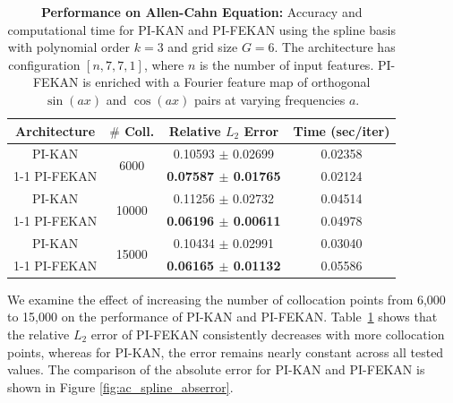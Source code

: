 \documentclass{article}
\begin{document}
\begin{table}[h!]
\centering
\begin{tabular}{|c|c||c|c||}
\hline
\textbf{Architecture} & \textbf{$\#$ Coll.} & \textbf{Relative $L_2$ Error} & \textbf{Time (sec/iter)} \\
\hline\hline
PI-KAN & \multirow{2}{*}{6000} & 0.10593 $\pm$ 0.02699 & 0.02358 \\ \cline{1-1} \cline{3-4}
PI-FEKAN & & \textbf{0.07587 $\pm$ 0.01765} & 0.02124 \\ 
\hline\hline
PI-KAN & \multirow{2}{*}{10000} & 0.11256 $\pm$ 0.02732 & 0.04514 \\ \cline{1-1} \cline{3-4}
PI-FEKAN & & \textbf{0.06196 $\pm$ 0.00611} & 0.04978 \\ 
\hline\hline
PI-KAN & \multirow{2}{*}{15000} & 0.10434 $\pm$ 0.02991 & 0.03040 \\ \cline{1-1} \cline{3-4}
PI-FEKAN & & \textbf{0.06165 $\pm$ 0.01132} & 0.05586 \\ 
\hline
\end{tabular}
\caption{\textbf{Performance on Allen-Cahn Equation:} Accuracy and computational time for PI-KAN and PI-FEKAN using the spline basis with polynomial order $k=3$ and grid size $G=6$. The architecture has configuration $[n, 7, 7, 1]$, where $n$ is the number of input features. PI-FEKAN is enriched with a Fourier feature map of orthogonal $\sin(ax)$ and $\cos(ax)$ pairs at varying frequencies $a$.}
\label{tab:2dac_spline}
\end{table}
We examine the effect of increasing the number of collocation points from 6,000 to 15,000 on the performance of PI-KAN and PI-FEKAN. Table~\ref{tab:2dac_spline} shows that the relative $L_2$ error of PI-FEKAN consistently decreases with more collocation points, whereas for PI-KAN, the error remains nearly constant across all tested values. The comparison of the absolute error for PI-KAN and PI-FEKAN is shown in Figure \ref{fig:ac_spline_abserror}.
 
\end{document}
